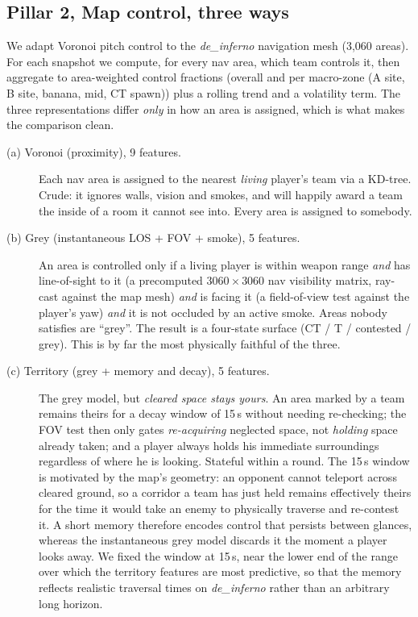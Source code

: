 \documentclass[11pt,a4paper]{article}
\begin{document}
\subsection{Pillar 2, Map control, three ways}
\label{sec:pillar2}

We adapt Voronoi pitch control to the \textit{de\_inferno} navigation mesh (3{,}060
areas). For each snapshot we compute, for every nav area, which team controls it, then
aggregate to area-weighted control fractions (overall and per macro-zone (A site, B
site, banana, mid, CT spawn)) plus a rolling trend and a volatility term. The three
representations differ \emph{only} in how an area is assigned, which is what makes the
comparison clean.

\begin{description}
  \item[(a) Voronoi (proximity), 9 features.] Each nav area is assigned to the nearest
    \emph{living} player's team via a KD-tree. Crude: it ignores walls, vision and
    smokes, and will happily award a team the inside of a room it cannot see into. Every
    area is assigned to somebody.

  \item[(b) Grey (instantaneous LOS + FOV + smoke), 5 features.] An area is controlled
    only if a living player is within weapon range \emph{and} has line-of-sight to it (a
    precomputed $3060 \times 3060$ nav visibility matrix, ray-cast against the map mesh)
    \emph{and} is facing it (a field-of-view test against the player's yaw) \emph{and} it
    is not occluded by an active smoke. Areas nobody satisfies are ``grey''. The result
    is a four-state surface (CT / T / contested / grey). This is by far the most
    physically faithful of the three.

  \item[(c) Territory (grey + memory and decay), 5 features.] The grey model, but
    \emph{cleared space stays yours}. An area marked by a team remains theirs for a decay
    window of 15\,s without needing re-checking; the FOV test then only gates
    \emph{re-acquiring} neglected space, not \emph{holding} space already taken; and a
    player always holds his immediate surroundings regardless of where he is looking.
    Stateful within a round. The 15\,s window is motivated by the map's geometry: an
    opponent cannot teleport across cleared ground, so a corridor a team has just held
    remains effectively theirs for the time it would take an enemy to physically traverse
    and re-contest it. A short memory therefore encodes control that persists between
    glances, whereas the instantaneous grey model discards it the moment a player looks
    away. We fixed the window at 15\,s, near the lower end of the range over which the
    territory features are most predictive, so that the memory reflects realistic
    traversal times on \textit{de\_inferno} rather than an arbitrary long horizon.
\end{description}
\end{document}
